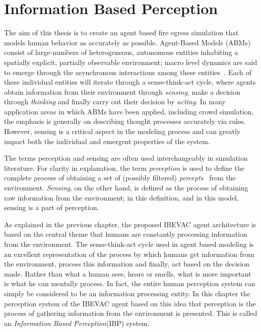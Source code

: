 
\chapter{Information Based Perception}
\label{chapter:IBP}
The aim of this thesis is to create an agent based fire egress simulation that models human behavior as accurately as possible. Agent-Based Models (ABMs) consist of large-numbers of heterogeneous, autonomous entities inhabiting a spatially explicit, partially observable environment; macro level dynamics are said to emerge through the asynchronous interactions among these entities~\cite{Bonabeau:2002um,Epstein:1999vn}. Each of these individual entities will iterate through a sense-think-act cycle, where agents obtain information from their environment through {\em sensing}, make a decision through {\em thinking} and finally carry out their decision by {\em acting}. In many application areas in which ABMs have been applied, including crowd simulation, the emphasis is generally on describing thought processes accurately via rules. However, sensing is a critical aspect in the modeling process and can greatly impact both the individual and emergent properties of the system.

The terms perception and sensing are often used interchangeably in simulation literature. For clarity in explanation, the term {\em perception} is used to define the complete process of obtaining a set of (possibly filtered) \emph{percepts}~\cite{Russel:1995vi} from the environment. {\em Sensing}, on the other hand, is defined as the process of obtaining raw information from the environment; in this definition, and in this model, sensing is a part of perception.

As explained in the previous chapter, the proposed IBEVAC agent architecture is based on the central theme that humans are constantly processing information from the environment. The sense-think-act cycle used in agent based modeling is an excellent representation of the process by which humans get information from the environment, process this information and finally, act based on the decision made. Rather than what a human sees, hears or smells, what is more important is what he can mentally process. In fact, the entire human perception system can simply be considered to be an information processing entity. In this chapter the perception system of the IBEVAC agent based on this idea that perception is the process of gathering information from the environment is presented. This is called an \emph{Information Based Perception}(IBP) system.

